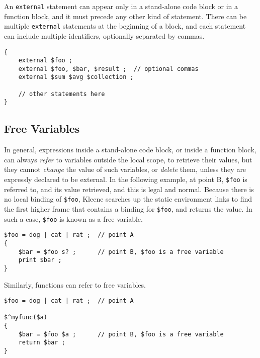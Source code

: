 An \texttt{external} statement can appear only in a stand-alone code block or in a
function block, and it must precede any other kind of statement.  There can be multiple
\texttt{external} statements at the beginning of a block, 
and each statement can include multiple
identifiers, optionally separated by commas.

\begin{samepage}
\begin{Verbatim}
{
    external $foo ;
    external $foo, $bar, $result ;  // optional commas
    external $sum $avg $collection ;

    // other statements here
}
\end{Verbatim}
\end{samepage}


\subsection{Free Variables}

In general, expressions inside a stand-alone code block, or inside a
function block, can always \emph{refer} to variables outside the local
scope, to retrieve their values, but they cannot \emph{change} the value
of such variables, or \emph{delete} them,  unless they are expressly declared to be external. In
the following example, at point B, \verb!$foo! is referred to, and its
value retrieved, and this is legal and normal.  Because there is no
local binding of \verb!$foo!, Kleene searches up the static environment
links to find the first higher frame that contains a binding for
\verb!$foo!,  and returns the value.  In such a case, \verb!$foo! is
known as a free variable.

\begin{samepage}
\begin{Verbatim}
$foo = dog | cat | rat ;  // point A
{
    $bar = $foo s? ;      // point B, $foo is a free variable
    print $bar ;
}
\end{Verbatim}
\end{samepage}

\noindent 
Similarly, functions can refer to free variables.

\begin{samepage}
\begin{Verbatim}
$foo = dog | cat | rat ;  // point A

$^myfunc($a)
{
    $bar = $foo $a ;      // point B, $foo is a free variable
    return $bar ;
}
\end{Verbatim}
\end{samepage}



